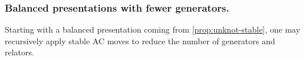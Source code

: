 \subsubsection{Balanced presentations with fewer generators.}
\label{sec:unknot-gives-potential-counterexamples-ac}
Starting with a balanced presentation coming from \autoref{prop:unknot-stable}, one may recursively apply stable AC moves to reduce the number of generators and relators. 
